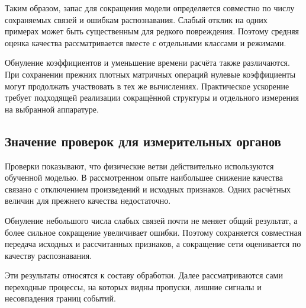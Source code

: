Таким образом, запас для сокращения модели определяется
совместно по числу сохраняемых связей и ошибкам распознавания.
Слабый отклик на одних примерах может быть существенным
для редкого повреждения. Поэтому средняя оценка качества
рассматривается вместе с отдельными классами и режимами.

Обнуление коэффициентов и уменьшение времени расчёта
также различаются. При сохранении прежних плотных матричных
операций нулевые коэффициенты могут продолжать участвовать
в тех же вычислениях. Практическое ускорение требует
подходящей реализации сокращённой структуры
и отдельного измерения на выбранной аппаратуре.

\subsection{Значение проверок для измерительных органов}
\label{sec:ch4_physical_checks_meaning}

{}

Проверки показывают, что физические ветви действительно
используются обученной моделью. В рассмотренном опыте
наибольшее снижение качества связано с отключением
произведений и исходных признаков. Одних расчётных
величин для прежнего качества недостаточно.

Обнуление небольшого числа слабых связей почти
не меняет общий результат, а более сильное сокращение
увеличивает ошибки. Поэтому сохраняется совместная
передача исходных и рассчитанных признаков,
а сокращение сети оценивается по качеству распознавания.

Эти результаты относятся к составу обработки.
Далее рассматриваются сами переходные процессы,
на которых видны пропуски, лишние сигналы
и несовпадения границ событий.
